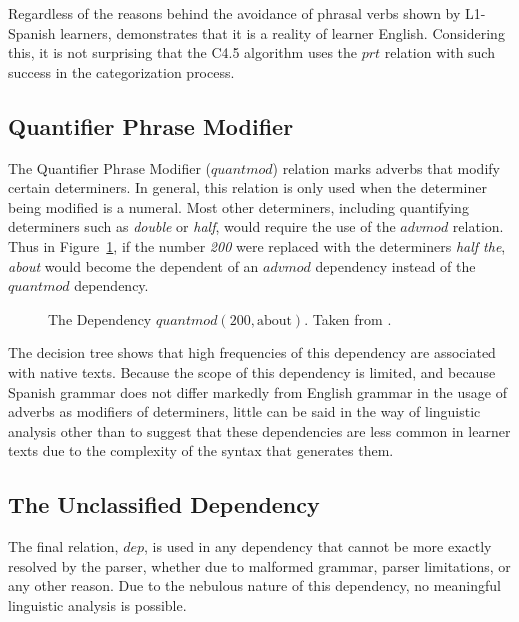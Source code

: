 \documentclass[main.tex]{subfiles}
\begin{document}
Regardless of the reasons behind the avoidance of phrasal verbs shown by L1-Spanish learners, \citet{gonzalez:2010} demonstrates that it is a reality of learner English. Considering this, it is not surprising that the C4.5 algorithm uses the $prt$ relation with such success in the categorization process.

\subsection{Quantifier Phrase Modifier}

The Quantifier Phrase Modifier ($quantmod$) relation marks adverbs that modify certain determiners. In general, this relation is only used when the determiner being modified is a numeral. Most other determiners, including quantifying determiners such as \textit{double} or \textit{half}, would require the use of the $advmod$ relation. Thus in Figure~\ref{ex:quantmod}, if the number \textit{200} were replaced with the determiners \textit{half the}, \textit{about} would become the dependent of an $advmod$ dependency instead of the $quantmod$ dependency.

\begin{figure}[h]
\centering
{}
\caption[The Dependency $quantmod(\text{200},\text{about})$]{The Dependency $quantmod(\text{200},\text{about})$. Taken from \citet{typed-deps-manual}.}
\label{ex:quantmod}
\end{figure}

The decision tree shows that high frequencies of this dependency are associated with native texts. Because the scope of this dependency is limited, and because Spanish grammar does not differ markedly from English grammar in the usage of adverbs as modifiers of determiners, little can be said in the way of linguistic analysis other than to suggest that these dependencies are less common in learner texts due to the complexity of the syntax that generates them.

\subsection{The Unclassified Dependency}

The final relation, $dep$, is used in any dependency that cannot be more exactly resolved by the parser, whether due to malformed grammar, parser limitations, or any other reason. Due to the nebulous nature of this dependency, no meaningful linguistic analysis is possible. 
\end{document}
